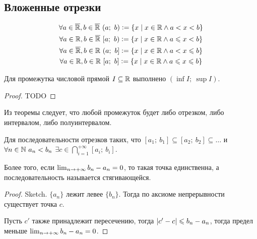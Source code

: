 \subsection{Вложенные отрезки}


\begin{gather}
    \forall a \in \overline{\mathbb{R}}, b \in \overline{\mathbb{R}}\ (a;\ b) \vcentcolon= \{x \;\vert\; x \in \mathbb{R} \land a < x < b \} \\
    \forall a \in \mathbb{R}, b \in \overline{\mathbb{R}}\ [a;\ b) \vcentcolon= \{x \;\vert\; x \in \mathbb{R} \land a \leqslant x < b \} \\
    \forall a \in \overline{\mathbb{R}}, b \in \mathbb{R}\ (a;\ b] \vcentcolon= \{x \;\vert\; x \in \mathbb{R} \land a < x \leqslant b \} \\
    \forall a \in \mathbb{R}, b \in \mathbb{R}\ [a;\ b] \vcentcolon= \{x \;\vert\; x \in \mathbb{R} \land a \leqslant x \leqslant b \}
\end{gather}

\begin{theorem}
    Для промежутка числовой прямой $I \subseteq \mathbb{R}$ выполнено $(\inf{I};\ \sup{I})$.
\end{theorem}
\begin{proof}
    TODO
\end{proof}

Из теоремы следует, что любой промежуток будет либо отрезком, либо интервалом, либо полуинтервалом.

\begin{theorem}
    Для последовательности отрезков таких, что $[a_1;\ b_1] \subseteq [a_2;\ b_2] \subseteq \ldots$ и $\forall n \in \mathbb{N}\ a_n < b_n$ $\exists c \in \bigcap_{i=1}^{+\infty} [a_i;\ b_i]$.

    Более того, если $\lim_{n\to+\infty} b_n - a_n =0$, то такая точка единственна, а последовательность называется стягивающейся.
\end{theorem}
\begin{proof}
    Sketch. $\{a_n\}$ лежит левее $\{b_n\}$. Тогда по аксиоме непрерывности существует точка $c$.

    Пусть $c'$ также принадлежит пересечению, тогда $\left\lvert c' - c \right\rvert \leqslant b_n - a_n$, тогда предел меньше $\lim_{n\to+\infty} b_n - a_n = 0$.
\end{proof}

